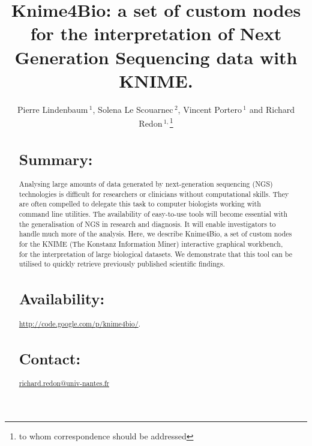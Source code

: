 \documentclass{bioinfo}
\begin{document}

\title[Knime4Bio]{Knime4Bio: a set of custom nodes for the interpretation of Next Generation Sequencing data with KNIME.}
\author[Pierre Lindenbaum \textit{et~al}]{Pierre Lindenbaum\,$^{1}$, Solena Le Scouarnec\,$^{2}$,  Vincent Portero\,$^{1}$ and Richard Redon\,$^{1,}$\footnote{to whom correspondence should be addressed}}
\address{$^{1}$Institut du thorax, Inserm UMR 915, Centre Hospitalier Universitaire de Nantes, 44000 Nantes, France.\\
$^{2}$The Wellcome Trust Sanger Institute, Hinxton, Cambridge CB10 1SA, UK.}



\maketitle

\begin{abstract}

\section{Summary:}
Analysing large amounts of data generated by next-generation sequencing (NGS) technologies is difficult for researchers or clinicians without computational skills. They are often compelled to delegate this task to computer biologists working with command line utilities. The availability of easy-to-use tools will become essential with the generalisation of NGS in research and diagnosis. It will enable investigators to handle much more of the analysis. Here, we describe Knime4Bio, a set of custom nodes for the KNIME (The Konstanz Information Miner) interactive graphical workbench, for the interpretation of large biological datasets. We demonstrate that this tool can be utilised to quickly retrieve previously published scientific findings.

\section{Availability:}
\href{http://code.google.com/p/knime4bio/}{http://code.google.com/p/knime4bio/}.

\section{Contact:} \href{mailto:richard.redon@univ-nantes.fr}{richard.redon@univ-nantes.fr}
\end{abstract}
\end{document}
